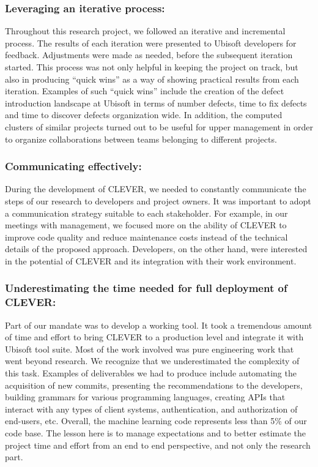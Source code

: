 \documentclass[sigconf]{acmart}
\begin{document}
\subsubsection{Leveraging an iterative
process:}\label{leveraging-an-iterative-process}

Throughout this research project, we followed an iterative and
incremental process. The results of each iteration were presented to
Ubisoft developers for feedback. Adjustments were made as needed, before
the subsequent iteration started. This process was not only helpful in
keeping the project on track, but also in producing ``quick wins'' as a
way of showing practical results from each iteration. Examples of such
``quick wins'' include the creation of the defect introduction landscape
at Ubisoft in terms of number defects, time to fix defects and time to
discover defects organization wide. In addition, the computed clusters
of similar projects turned out to be useful for upper management in
order to organize collaborations between teams belonging to different
projects.

\subsubsection{Communicating
effectively:}\label{communicating-effectively}

During the development of CLEVER, we needed to constantly communicate
the steps of our research to developers and project owners. It was
important to adopt a communication strategy suitable to each
stakeholder. For example, in our meetings with management, we focused
more on the ability of CLEVER to improve code quality and reduce
maintenance costs instead of the technical details of the proposed
approach. Developers, on the other hand, were interested in the
potential of CLEVER and its integration with their work environment.

\subsubsection{Underestimating the time needed for full deployment of
CLEVER:}\label{underestimating-the-time-needed-for-full-deployment-of-clever}

Part of our mandate was to develop a working tool. It took a tremendous
amount of time and effort to bring CLEVER to a production level and
integrate it with Ubisoft tool suite. Most of the work involved was pure
engineering work that went beyond research. We recognize that we
underestimated the complexity of this task. Examples of deliverables we
had to produce include automating the acquisition of new commits,
presenting the recommendations to the developers, building grammars for
various programming languages, creating APIs that interact with any
types of client systems, authentication, and authorization of end-users,
etc. Overall, the machine learning code represents less than 5\% of our
code base. The lesson here is to manage expectations and to better
estimate the project time and effort from an end to end perspective, and
not only the research part.
\end{document}
